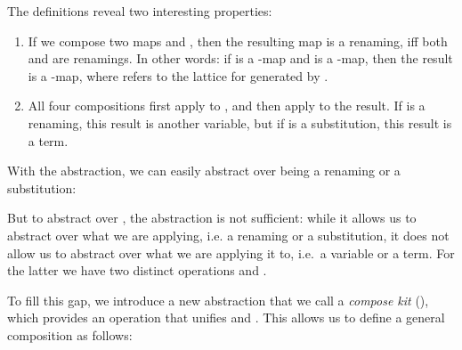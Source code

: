 \documentclass[a4paper, UKenglish, cleveref, autoref, thm-restate]{lipics-v2021}
\newenvironment{ExampleCode*}{%
  \begin{tcolorbox}[%
    colframe=white,%
    colback=yellow!5,%
    boxrule=0.0pt,%
    top=2.5pt,%
    left=2.5pt,%
    bottom=2.5pt,%
    right=2.5pt,%
    before skip=5pt,%
    after skip=5pt,%
    boxsep=0pt%
  ]\vspace{-0.2\baselineskip}%
}{%
  \vspace{-1\baselineskip}%
  \end{tcolorbox}%
}
\newcommand*\ExampleCode[1]{\begin{ExampleCode*}{#1}\end{ExampleCode*}}
\newcommand*\ACode[1]{\AgdaFontStyle{\textcolor{mygray}{#1}}}
\newcommand*\AField[1]{\AgdaField{#1}}
\newcommand*\ACon[1]{\AgdaInductiveConstructor{#1}}
\newcommand*\ADef[1]{\AgdaFunction{#1}}
\begin{document}
  \noindent
  \begin{minipage}[t]{0.65\linewidth}
  \ExampleCode\KExFourCompsI
  \end{minipage}
  \begin{minipage}[t]{0.35\linewidth}
  \ExampleCode\KExFourCompsII
  \end{minipage}

  The definitions reveal two interesting properties:
  \begin{enumerate}
  \item
    If we compose two maps \ACode{ϕ₁} and \ACode{ϕ₂}, then the
    resulting map is a renaming, iff both \ACode{ϕ₁} and \ACode{ϕ₂} are
    renamings.
    In other words:
    if \ACode{ϕ₁} is a \ACode{K₁}-map and \ACode{ϕ₂} is a \ACode{K₂}-map,
    then the result is a \ACode{(K₁ ⊔ K₂)}-map, where \ACode{⊔} refers to the
    lattice for \ACode{\{ \ADef{Kᵣ} , \ADef{Kₛ} \}}
    generated by \ACode{\ADef{Kᵣ} < \ADef{Kₛ}}.
  \item
    All four compositions first apply \ACode{ϕ₁} to \ACode{x},
    and then apply \ACode{ϕ₂} to the result.
    If \ACode{ϕ₁} is a renaming, this result is another variable, but
    if \ACode{ϕ₁} is a substitution, this result is a term.
  \end{enumerate}
  With the \ACode{\ACon{Kit}} abstraction, we can easily abstract over
  \ACode{ϕ₂} being a renaming or a substitution:

  \noindent
  \begin{minipage}[t]{0.65\linewidth}
  \ExampleCode\KExTwoCompsI
  \end{minipage}
  \begin{minipage}[t]{0.35\linewidth}
  \ExampleCode\KExTwoCompsII
  \end{minipage}

  \noindent But to abstract over \ACode{ϕ₁}, the \ACode{\ACon{Kit}} abstraction
  is not sufficient: while it allows us to abstract over what we are applying, i.e.
  a renaming or a substitution, it does not allow us to
  abstract over what we are applying it to, i.e.\ a variable or a term.
  For the latter we have two distinct operations \ACode{\ADef{\_\&\_}}
  and \ACode{\ADef{\_⋯\_}}.

  To fill this gap, we introduce a new abstraction that we call a
  \emph{compose kit} (\ACode{\ACon{CKit}}),
  which provides an operation \ACode{\AField{\_\&/⋯\_}} that unifies
  \ACode{\ADef{\_\&\_}} and \ACode{\ADef{\_⋯\_}}. This allows us to
  define a general composition as follows:
  \ExampleCode\KComposition
\end{document}

